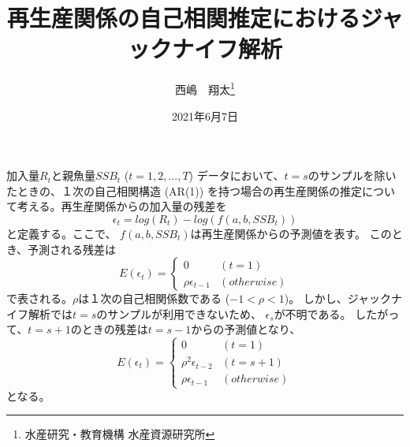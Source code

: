 \documentclass{jsarticle}
\title{再生産関係の自己相関推定におけるジャックナイフ解析}
\author{西嶋　翔太\thanks{水産研究・教育機構 水産資源研究所}}
\date{2021年6月7日}
\begin{document}
 
\maketitle

加入量$R_t$と親魚量$SSB_t$ ($t = 1,2,...,T$) データにおいて、$t = s$のサンプルを除いたときの、１次の自己相関構造 (AR(1)) を持つ場合の再生産関係の推定について考える。再生産関係からの加入量の残差を
$$ \epsilon_t = log(R_t) - log(f(a,b,SSB_t))$$
と定義する。ここで、 $f(a,b,SSB_t)$は再生産関係からの予測値を表す。
このとき、予測される残差は
\begin{equation}
E({\epsilon}_t) = 
\begin{cases}
0 & (t = 1) \\
\rho \epsilon_{t-1} & (otherwise)
\end{cases}
\end{equation}
で表される。$\rho$は１次の自己相関係数である ($-1 < \rho < 1$)。
しかし、ジャックナイフ解析では$t = s$のサンプルが利用できないため、 $\epsilon_{s}$が不明である。
したがって、$t = s + 1$のときの残差は$t = s - 1$からの予測値となり、
\begin{equation}
E({\epsilon}_t) = 
\begin{cases}
0 & (t = 1) \\
\rho^2 \epsilon_{t-2} & (t = s + 1) \\
\rho \epsilon_{t-1} & (otherwise)
\end{cases}
\end{equation}
となる。  
\end{document}
